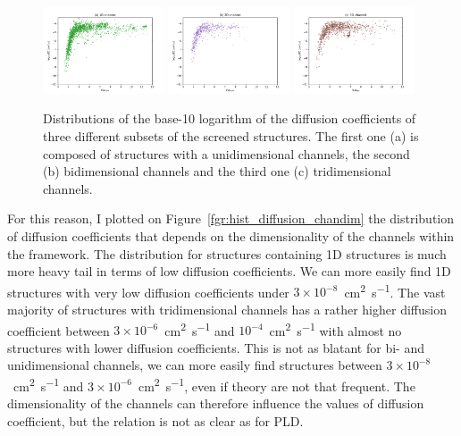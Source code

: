 \documentclass[main]{subfiles}
\begin{document}
\begin{figure}[ht]
  \centering
    \includegraphics[width=0.32\textwidth]{figures/5-diffusion/D_log-PLD_1D_chan.pdf}
    \includegraphics[width=0.32\textwidth]{figures/5-diffusion/D_log-PLD_2D_chan.pdf}
    \includegraphics[width=0.32\textwidth]{figures/5-diffusion/D_log-PLD_3D_chan.pdf}
    \caption{ Distributions of the base-10 logarithm of the diffusion coefficients of three different subsets of the screened structures. The first one (a) is composed of structures with a unidimensional channels, the second (b) bidimensional channels and the third one (c) tridimensional channels. }\label{fgr:scatter_diffusion_chandim}
\end{figure}

For this reason, I plotted on Figure~\ref{fgr:hist_diffusion_chandim} the distribution of diffusion coefficients that depends on the dimensionality of the channels within the framework. The distribution for structures containing 1D structures is much more heavy tail in terms of low diffusion coefficients. We can more easily find 1D structures with very low diffusion coefficients under $3\times 10^{-8}$~\si{\square\cm\per\s}. The vast majority of structures with tridimensional channels has a rather higher diffusion coefficient between $3\times 10^{-6}$~\si{\square\cm\per\s} and $10^{-4}$~\si{\square\cm\per\s} with almost no structures with lower diffusion coefficients. This is not as blatant for bi- and unidimensional channels, we can more easily find structures between $3\times 10^{-8}$~\si{\square\cm\per\s} and $3\times 10^{-6}$~\si{\square\cm\per\s}, even if theory are not that frequent. The dimensionality of the channels can therefore influence the values of diffusion coefficient, but the relation is not as clear as for PLD.
\end{document}
